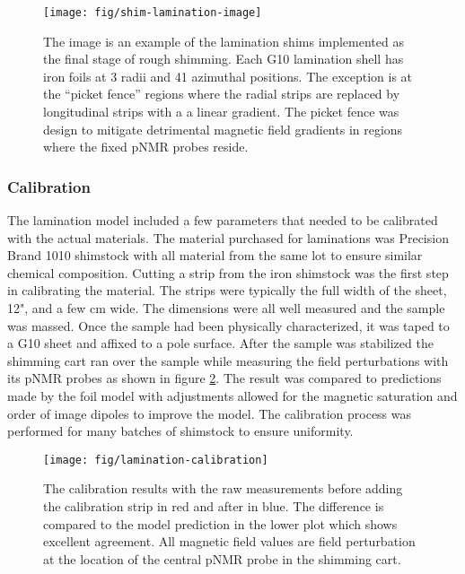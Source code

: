 \begin{figure}
\centering
\texttt{[image: fig/shim-lamination-image]}
\caption{
    The image is an example of the lamination shims implemented as the final stage of rough shimming.  Each G10 lamination shell has iron foils at 3 radii and 41 azimuthal positions.  The exception is at the ``picket fence'' regions where the radial strips are replaced by longitudinal strips with a a linear gradient.  The picket fence was design to mitigate detrimental magnetic field gradients in regions where the fixed pNMR probes reside.
    \label{fig:shim-lamination-image}
}
\end{figure}

\subsubsection{Calibration}

The lamination model included a few parameters that needed to be calibrated with the actual materials.  The material purchased for laminations was Precision Brand 1010 shimstock with all material from the same lot to ensure similar chemical composition.  Cutting a strip from the iron shimstock was the first step in calibrating the material.  The strips were typically the full width of the sheet, 12", and a few \si{\centi\meter} wide.  The dimensions were all well measured and the sample was massed.  Once the sample had been physically characterized, it was taped to a G10 sheet and affixed to a pole surface.  After the sample was stabilized the shimming cart ran over the sample while measuring the field perturbations with its pNMR probes as shown in figure \ref{fig:lamination-calibration}.  The result was compared to predictions made by the foil model with adjustments allowed for the magnetic saturation and order of image dipoles to improve the model.  The calibration process was performed for many batches of shimstock to ensure uniformity.

\begin{figure}
\centering
\texttt{[image: fig/lamination-calibration]}
\caption{
    The calibration results with the raw measurements before adding the calibration strip in red and after in blue.  The difference is compared to the model prediction in the lower plot which shows excellent agreement.  All magnetic field values are field perturbation at the location of the central pNMR probe in the shimming cart. 
    \label{fig:lamination-calibration}
}
\end{figure}

